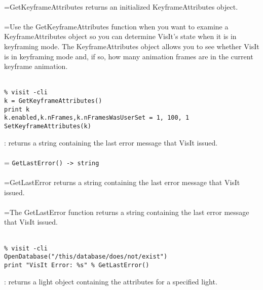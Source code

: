 \documentclass[10pt,a4paper]{report}
\begin{document}
 \\ 
\hangindent=\parindent GetKeyframeAttributes returns an initialized KeyframeAttributes object. \\[-3mm] 

 \\ 
\hangindent=\parindent Use the GetKeyframeAttributes function when you want to examine a KeyframeAttributes object so you can determine VisIt's state when it is in keyframing mode. The KeyframeAttributes object allows you to see whether VisIt is in keyframing mode and, if so, how many animation frames are in the current keyframe animation. \\[-3mm] 

\\[-6mm]
\begin{verbatim}% visit -cli
k = GetKeyframeAttributes()
print k
k.enabled,k.nFrames,k.nFramesWasUserSet = 1, 100, 1
SetKeyframeAttributes(k)
\end{verbatim}
\newpage


{}
: returns a string containing the last error message that VisIt issued.\\[-3mm]

 \\ 
\hangindent=\parindent 
\verb!GetLastError() -> string!\\ [-3mm]

 \\ 
\hangindent=\parindent GetLastError returns a string containing the last error message that VisIt issued. \\[-3mm] 

 \\ 
\hangindent=\parindent The GetLastError function returns a string containing the last error message that VisIt issued. \\[-3mm] 

\\[-6mm]
\begin{verbatim}% visit -cli
OpenDatabase("/this/database/does/not/exist")
print "VisIt Error: %s" % GetLastError()
\end{verbatim}
\newpage


{}
: returns a light object containing the attributes for a specified light.\\[-3mm]
\end{document}

